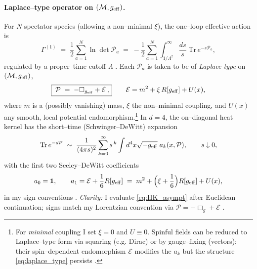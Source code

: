 \documentclass{iopjournal}
\begin{document}
\paragraph{Laplace–type operator on $(\mathcal{M},g_{\rm eff})$.}
For $N$ spectator species (allowing a non–minimal $\xi$), the one–loop effective action is
\begin{equation}
\Gamma^{(1)}\;=\;\frac{1}{2}\sum_{a=1}^{N}\ln\det \mathcal{P}_a
\;=\;-\frac{1}{2}\sum_{a=1}^{N}\int_{1/\Lambda^2}^\infty\frac{ds}{s}\;\mathrm{Tr}\,e^{-s\mathcal{P}_a},
\label{eq:proper_time}
\end{equation}
regulated by a proper–time cutoff $\Lambda$ \cite{DeWitt1965,BarvinskyVilkovisky,ParkerToms,Vassilevich2003}. Each $\mathcal{P}_a$ is taken to be of \emph{Laplace type} on $(\mathcal{M},g_{\rm eff})$,
\begin{equation}
\boxed{\;\mathcal{P}\;=\;-\Box_{g_{\rm eff}}+\mathcal{E}\;,}\qquad
\mathcal{E}=m^2+\xi\,R[g_{\rm eff}]+U(x),
\label{eq:laplace_type}
\end{equation}
where $m$ is a (possibly vanishing) mass, $\xi$ the non–minimal coupling, and $U(x)$ any smooth, local potential endomorphism.\footnote{For \emph{minimal} coupling I set $\xi=0$ and $U\equiv 0$. Spinful fields can be reduced to Laplace–type form via squaring (e.g. Dirac) or by gauge–fixing (vectors); their spin–dependent endomorphism $\mathcal{E}$ modifies the $a_k$ but the structure \eqref{eq:laplace_type} persists \cite{ParkerToms,Vassilevich2003,Avramidi2000}.}
In $d=4$, the on–diagonal heat kernel has the short–time (Schwinger–DeWitt) expansion
\begin{equation}
\mathrm{Tr}\,e^{-s\mathcal{P}}\;\sim\;\frac{1}{(4\pi s)^2}\sum_{k=0}^\infty s^{\,k}\int d^4x\sqrt{-g_{\rm eff}}\;a_k(x,\mathcal{P}),
\qquad s\downarrow 0,
\label{eq:HK_asympt}
\end{equation}
with the first two Seeley–DeWitt coefficients
\begin{equation}
a_0=\mathbf{1},
\qquad
a_1=\mathcal{E}+\frac{1}{6}R[g_{\rm eff}]
\;=\;m^2+\Big(\xi+\frac{1}{6}\Big)R[g_{\rm eff}]+U(x),
\label{eq:a0a1}
\end{equation}
in my sign conventions \cite{DeWitt1965,Vassilevich2003,Avramidi2000}. \emph{Clarity:} I evaluate \eqref{eq:HK_asympt} after Euclidean continuation; signs match my Lorentzian convention via $\mathcal{P}=-\Box_g+\mathcal{E}$ \cite{ParkerToms,Vassilevich2003}.
\end{document}
